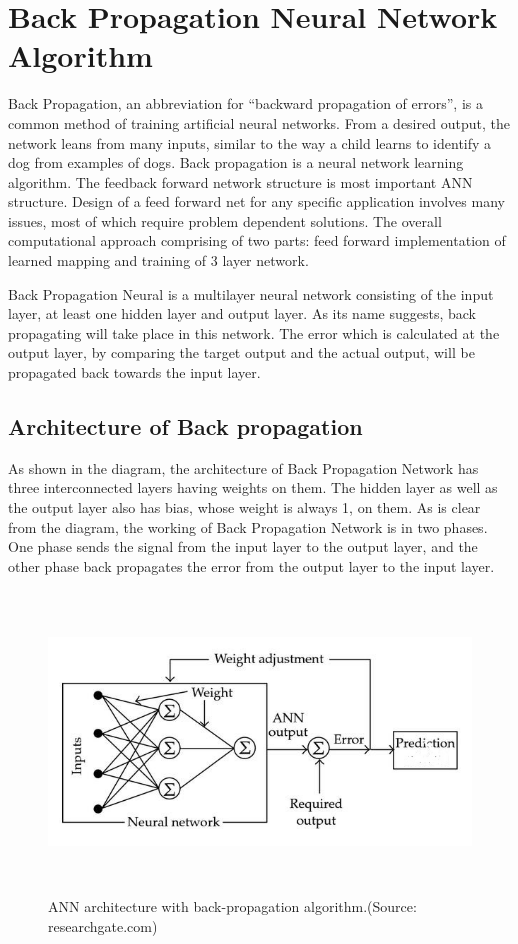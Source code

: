 \section{Back Propagation Neural Network Algorithm}
Back Propagation, an abbreviation for “backward propagation of errors”, is a common method of training artificial neural networks. From a desired output, the network leans from many inputs, similar to the way a child learns to identify a dog from examples of dogs. Back propagation is a neural network learning algorithm. The feedback forward network structure is most important ANN structure. Design of a feed forward net for any specific application involves many issues, most of which require problem dependent solutions. The overall computational approach comprising of two parts: feed forward implementation of learned mapping and training of 3 layer network.\par
Back Propagation Neural is a multilayer neural network consisting of the input layer, at least one hidden layer and output layer. As its name suggests, back propagating will take place in this network. The error which is calculated at the output layer, by comparing the target output and the actual output, will be propagated back towards the input layer.
 

\subsection{Architecture of Back propagation}
As shown in the diagram, the architecture of Back Propagation Network has three interconnected layers having weights on them. The hidden layer as well as the output layer also has bias, whose weight is always 1, on them. As is clear from the diagram, the working of Back Propagation Network is in two phases. One phase sends the signal from the input layer to the output layer, and the other phase back propagates the error from the output layer to the input layer.

  \begin{figure}[h]
  \begin{center}
  \includegraphics[width=120mm,height=80mm]{images/ANNBack.jpg}
  \caption{ANN architecture with back-propagation algorithm.(Source: researchgate.com)}
  \end{center}
  \end{figure}  
   
